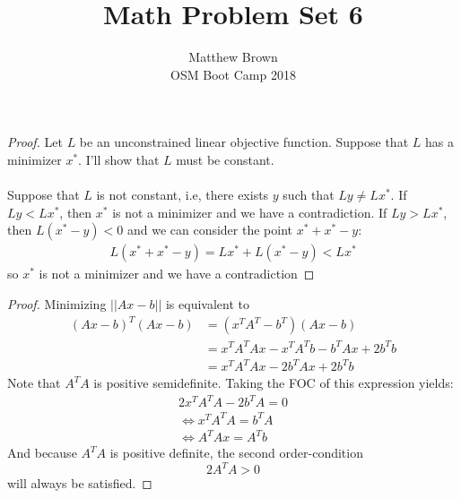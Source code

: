 \documentclass[12pt]{article}
\newenvironment{problem}[2][Problem]{\begin{trivlist}
\item[\hskip \labelsep {\bfseries #1}\hskip \labelsep {\bfseries #2.}]}{\end{trivlist}}
\theoremstyle{definition}
\theoremstyle{definition}
\theoremstyle{definition}
\theoremstyle{definition}
\begin{document}
\title{Math Problem Set 6}
\author{Matthew Brown\\ 
OSM Boot Camp 2018} %
 
\maketitle
 
\begin{problem}{9.1}
\begin{proof}
Let $L$ be an unconstrained linear objective function. Suppose that $L$ has a minimizer $x^*$. I'll show that $L$ must be constant. \\ 
\\
Suppose that $L$ is not constant, i.e, there exists $y$ such that $Ly \neq Lx^*$. If $Ly < Lx^*$, then $x^*$ is not a minimizer and we have a contradiction. If $Ly > Lx^*$, then $L(x^* - y) < 0$ and we can consider the point $x^* + x^* - y$: 
\begin{align*}
L(x^* + x^* -y) = Lx^* + L(x^* - y) < Lx^*
\end{align*} 
so $x^*$ is not a minimizer and we have a contradiction
\end{proof}
\end{problem}

\begin{problem}{9.2}
\begin{proof}
Minimizing $||Ax-b||$ is equivalent to \begin{align*}
(Ax-b)^T(Ax-b) &= (x^TA^T - b^T)(Ax-b) \\ 
&= x^TA^TAx - x^TA^Tb -b^TAx +2b^Tb \\
&= x^TA^TAx -2b^TAx +2b^Tb
\end{align*}
Note that $A^TA$ is positive semidefinite. Taking the FOC of this expression yields:
\begin{align*}
2x^TA^TA - 2b^TA = 0 \\
\iff x^TA^TA = b^TA \\
\iff A^TAx = A^Tb
\end{align*}
And because $A^TA$ is positive definite, the second order-condition 
$$
2A^TA > 0
$$
will always be satisfied.
\end{proof}
\end{problem}
\end{document}

